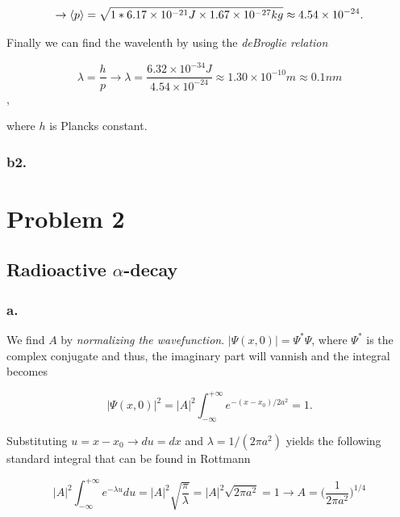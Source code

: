 \documentclass{article}
\begin{document}
\begin{equation}
\rightarrow \braket{p} = \sqrt{1*6.17\times 10^{-21}J\times 1.67\times 10^{-27}kg} \approx 4.54\times 10^{-24}.
\end{equation}

Finally we can find the wavelenth by using the \textit{deBroglie relation} 

\begin{equation}
\lambda = \frac{h}{p} \rightarrow \lambda = \frac{6.32\times 10^{-34}J}{4.54\times 10^{-24}} \approx 1.30\times 10^{-10}m \approx 0.1nm
\end{equation},

where $h$ is Plancks constant.

\subsubsection*{b2.}



\section*{Problem 2}

\subsection*{Radioactive $\alpha$-decay}

\subsubsection*{a.}

We find $A$ by \textit{normalizing the wavefunction}. $|\Psi(x, 0)| = \Psi^*\Psi$, where $\Psi^*$ is the complex conjugate and thus, the imaginary part will vannish and the integral becomes

\begin{equation}
|\Psi(x, 0)|^2 = |A|^2\int_{-\infty}^{+\infty}e^{-(x-x_0)/2a^2} = 1.
\end{equation}

Substituting $u = x-x_0 \rightarrow du = dx$ and $\lambda = 1/(2\pi a^2)$ yields the following standard integral that can be found in Rottmann

\begin{equation}
|A|^2\int_{-\infty}^{+\infty} e^{-\lambda u} du = |A|^2\sqrt{\frac{\pi}{\lambda}} = |A|^2\sqrt{2\pi a^2} = 1 \rightarrow A = \bigg(\frac{1}{2\pi a^2}\bigg)^{1/4}
\end{equation}
\end{document}

